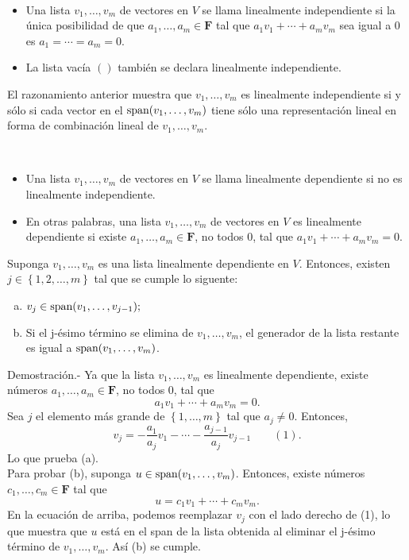 \begin{mydef}\,\\
    \begin{itemize}
	\item Una lista $v_1,\ldots,v_m$ de vectores en $V$ se llama linealmente independiente si la única posibilidad de que  $a_1,\ldots,a_m\in \textbf{F}$ tal que $a_1v_1+\cdots+a_mv_m$ sea igual a $0$ es $a_1=\cdots=a_m=0.$
	\item La lista vacía $()$ también se declara linealmente independiente.
    \end{itemize}
\end{mydef}

El razonamiento anterior muestra que $v_1,\ldots,v_m$ es linealmente independiente si y sólo si cada vector en el $\mathop{\mbox{\normalfont span}}\nolimits(v_1,\ldots,v_m)$ tiene sólo una representación lineal en forma de combinación lineal de $v_1,\ldots,v_m$.

\setcounter{mydef}{18}
\begin{mydef}\,\\
    \begin{itemize}
	\item Una lista $v_1,\ldots,v_m$ de vectores en $V$ se llama linealmente dependiente si no es linealmente independiente.
	\item En otras palabras, una lista $v_1,\ldots,v_m$ de vectores en $V$ es linealmente dependiente si existe $a_1,\ldots,a_m\in \textbf{F}$, no todos $0$, tal que $a_1v_1+\cdots+a_mv_m=0$.
    \end{itemize}
\end{mydef}

\setcounter{mylema}{20}
\begin{mylema}
    Suponga $v_1,\ldots,v_m$ es una lista linealmente dependiente en $V$. Entonces, existen $j\in\left\{1,2,\ldots,m\right\}$ tal que se cumple lo siguente:
    \begin{enumerate}[(a)]
	\item $v_j\in \mathop{\mbox{\normalfont span}}\nolimits(v_1,\ldots,v_{j-1});$
	\item Si el j-ésimo término se elimina de $v_1,\ldots,v_m$, el generador de la lista restante es igual a $\mathop{\mbox{\normalfont span}}\nolimits(v_1,\ldots,v_m)$.\\
    \end{enumerate}
    Demostración.-\; Ya que la lista $v_1,\ldots,v_m$ es linealmente dependiente, existe números $a_1,\ldots,a_m\in \textbf{F}$, no todos $0$, tal que
    $$a_1v_1+\cdots + a_mv_m=0.$$
    Sea $j$ el elemento más grande de $\left\{1,\ldots, m\right\}$ tal que $a_j\neq 0$. Entonces,
    $$v_j=-\dfrac{a_1}{a_j}v_1-\cdots-\dfrac{a_{j-1}}{a_j}v_{j-1}\qquad (1).$$
    Lo que prueba (a). \\
    Para probar (b), suponga $u\in \mathop{\mbox{\normalfont span}}\nolimits(v_1,\ldots,v_m)$. Entonces, existe números $c_1,\ldots,c_m\in \textbf{F}$ tal que
    $$u=c_1v_1+\cdots+c_mv_m.$$
    En la ecuación de arriba, podemos reemplazar $v_j$ con el lado derecho de (1), lo que muestra que $u$ está en el span de la lista obtenida al eliminar el j-ésimo término de $v_1,\ldots,v_m$. Así (b) se cumple.
\end{mylema}

